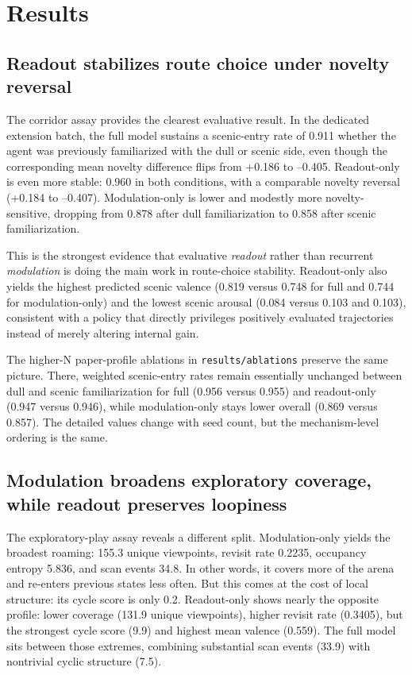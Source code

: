 \documentclass[letterpaper]{article}
\begin{document}
\section{Results}
\subsection{Readout stabilizes route choice under novelty reversal}
The corridor assay provides the clearest evaluative result. In the dedicated extension batch, the full model sustains a scenic-entry rate of 0.911 whether the agent was previously familiarized with the dull or scenic side, even though the corresponding mean novelty difference flips from +0.186 to --0.405. Readout-only is even more stable: 0.960 in both conditions, with a comparable novelty reversal (+0.184 to --0.407). Modulation-only is lower and modestly more novelty-sensitive, dropping from 0.878 after dull familiarization to 0.858 after scenic familiarization.

This is the strongest evidence that evaluative \emph{readout} rather than recurrent \emph{modulation} is doing the main work in route-choice stability. Readout-only also yields the highest predicted scenic valence (0.819 versus 0.748 for full and 0.744 for modulation-only) and the lowest scenic arousal (0.084 versus 0.103 and 0.103), consistent with a policy that directly privileges positively evaluated trajectories instead of merely altering internal gain.

The higher-N paper-profile ablations in \texttt{results/ablations} preserve the same picture. There, weighted scenic-entry rates remain essentially unchanged between dull and scenic familiarization for full (0.956 versus 0.955) and readout-only (0.947 versus 0.946), while modulation-only stays lower overall (0.869 versus 0.857). The detailed values change with seed count, but the mechanism-level ordering is the same.

\subsection{Modulation broadens exploratory coverage, while readout preserves loopiness}
The exploratory-play assay reveals a different split. Modulation-only yields the broadest roaming: 155.3 unique viewpoints, revisit rate 0.2235, occupancy entropy 5.836, and scan events 34.8. In other words, it covers more of the arena and re-enters previous states less often. But this comes at the cost of local structure: its cycle score is only 0.2. Readout-only shows nearly the opposite profile: lower coverage (131.9 unique viewpoints), higher revisit rate (0.3405), but the strongest cycle score (9.9) and highest mean valence (0.559). The full model sits between those extremes, combining substantial scan events (33.9) with nontrivial cyclic structure (7.5).
\end{document}
